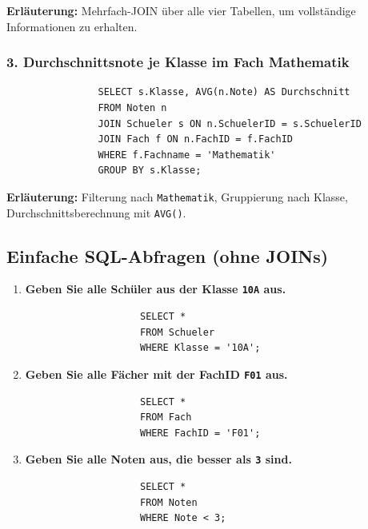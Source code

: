 \documentclass[a4paper,12pt]{article}
\begin{document}
\begin{enumerate}
			\textbf{Erläuterung:}  
			Mehrfach-JOIN über alle vier Tabellen, um vollständige Informationen zu erhalten.
			
			\vspace{1em}
			
			\subsubsection*{3. Durchschnittsnote je Klasse im Fach Mathematik}
			
			\begin{verbatim}
				SELECT s.Klasse, AVG(n.Note) AS Durchschnitt
				FROM Noten n
				JOIN Schueler s ON n.SchuelerID = s.SchuelerID
				JOIN Fach f ON n.FachID = f.FachID
				WHERE f.Fachname = 'Mathematik'
				GROUP BY s.Klasse;
			\end{verbatim}
			
			\textbf{Erläuterung:}  
			Filterung nach \texttt{Mathematik}, Gruppierung nach Klasse, Durchschnittsberechnung mit \texttt{AVG()}.
			
			\subsection*{Einfache SQL-Abfragen (ohne JOINs)}
			
			\begin{enumerate}
				\item \textbf{Geben Sie alle Schüler aus der Klasse \texttt{10A} aus.}
				
				\begin{verbatim}
					SELECT * 
					FROM Schueler
					WHERE Klasse = '10A';
				\end{verbatim}
				
				\vspace{1em}
				
				\item \textbf{Geben Sie alle Fächer mit der FachID \texttt{F01} aus.}
				
				\begin{verbatim}
					SELECT * 
					FROM Fach
					WHERE FachID = 'F01';
				\end{verbatim}
				
				\vspace{1em}
				
				\item \textbf{Geben Sie alle Noten aus, die besser als \texttt{3} sind.}
				
				\begin{verbatim}
					SELECT * 
					FROM Noten
					WHERE Note < 3;
				\end{verbatim}
				
			\end{enumerate}
		\end{enumerate}
\end{document}
